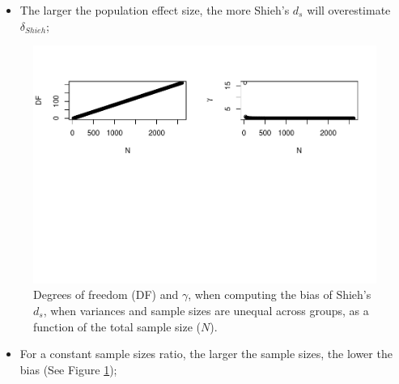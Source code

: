 \documentclass[
  english,
  man,mask]{apa6}
\providecommand{\tightlist}{%
  \setlength{\itemsep}{0pt}\setlength{\parskip}{0pt}}
\begin{document}
\begin{itemize}
\tightlist
\item
  The larger the population effect size, the more Shieh's \(d_s\) will overestimate \(\delta_{Shieh}\);
\end{itemize}

\begin{figure}
\centering
\includegraphics{Theoretical-Bias-of-all-estimators-as-a-function-of-population-parameters_files/figure-latex/biasshiehhetunbalNsize2-1.pdf}
\caption{\label{fig:biasshiehhetunbalNsize2}Degrees of freedom (DF) and \(\gamma\), when computing the bias of Shieh's \(d_s\), when variances and sample sizes are unequal across groups, as a function of the total sample size (\(N\)).}
\end{figure}

\begin{itemize}
\tightlist
\item
  For a constant sample sizes ratio, the larger the sample sizes, the lower the bias (See Figure \ref{fig:biasshiehhetunbalNsize2});
\end{itemize}
\end{document}
